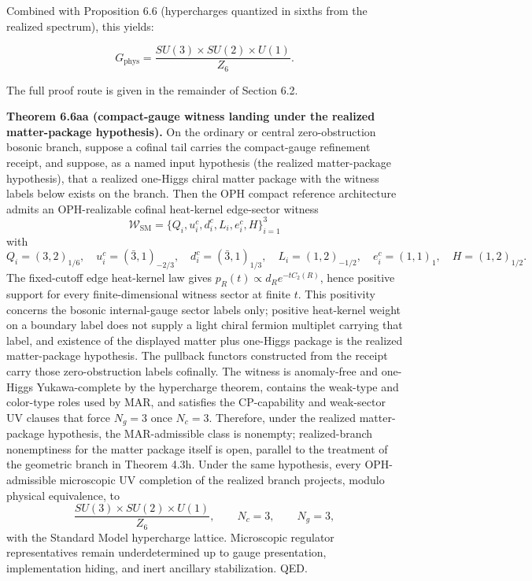 Combined with Proposition 6.6 (hypercharges quantized in sixths from the realized spectrum), this yields:

\[
G_{\mathrm{phys}} = \frac{SU(3) \times SU(2) \times U(1)}{Z_6}.
\]

The full proof route is given in the remainder of Section 6.2.

\textbf{Theorem 6.6aa (compact-gauge witness landing under the realized matter-package hypothesis).} On the ordinary or central zero-obstruction bosonic branch, suppose a cofinal tail carries the compact-gauge refinement receipt, and suppose, as a named input hypothesis (the realized matter-package hypothesis), that a realized one-Higgs chiral matter package with the witness labels below exists on the branch. Then the OPH compact reference architecture admits an OPH-realizable cofinal heat-kernel edge-sector witness
\[
\mathcal W_{\mathrm{SM}}
=
\{Q_i,u_i^c,d_i^c,L_i,e_i^c,H\}_{i=1}^{3}
\]
with
\[
Q_i=(3,2)_{1/6},\quad
u_i^c=(\bar 3,1)_{-2/3},\quad
d_i^c=(\bar 3,1)_{1/3},\quad
L_i=(1,2)_{-1/2},\quad
e_i^c=(1,1)_1,\quad
H=(1,2)_{1/2}.
\]
The fixed-cutoff edge heat-kernel law gives \(p_R(t)\propto d_R e^{-tC_2(R)}\), hence positive support for every finite-dimensional witness sector at finite \(t\). This positivity concerns the bosonic internal-gauge sector labels only; positive heat-kernel weight on a boundary label does not supply a light chiral fermion multiplet carrying that label, and existence of the displayed matter plus one-Higgs package is the realized matter-package hypothesis. The pullback functors constructed from the receipt carry those zero-obstruction labels cofinally. The witness is anomaly-free and one-Higgs Yukawa-complete by the hypercharge theorem, contains the weak-type and color-type roles used by MAR, and satisfies the CP-capability and weak-sector UV clauses that force \(N_g=3\) once \(N_c=3\). Therefore, under the realized matter-package hypothesis, the MAR-admissible class is nonempty; realized-branch nonemptiness for the matter package itself is open, parallel to the treatment of the geometric branch in Theorem 4.3h. Under the same hypothesis, every OPH-admissible microscopic UV completion of the realized branch projects, modulo physical equivalence, to
\[
\frac{SU(3)\times SU(2)\times U(1)}{Z_6},
\qquad
N_c=3,\qquad
N_g=3,
\]
with the Standard Model hypercharge lattice. Microscopic regulator representatives remain underdetermined up to gauge presentation, implementation hiding, and inert ancillary stabilization. QED.

